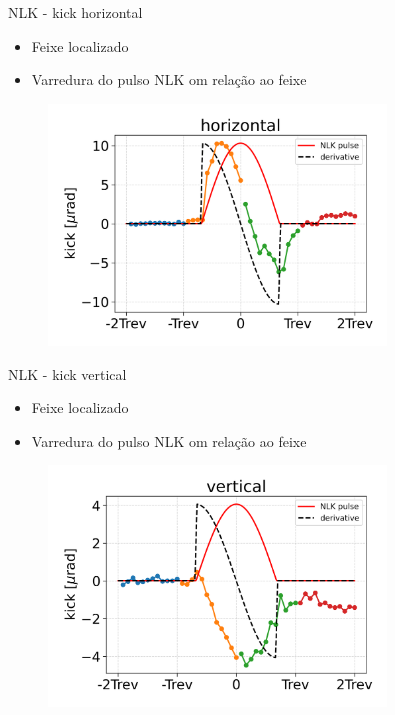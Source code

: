 \documentclass{beamer}					  %
\begin{document}
\begin{frame}{NLK - kick horizontal}
    \scriptsize{\begin{itemize}
    		\item Feixe localizado
            \item Varredura do pulso NLK om relação ao feixe
    \end{itemize}}
    \begin{figure}[H]
        	\centering
            \includegraphics[width=0.8\textwidth]{2024-01-26/figures/nlk_horizontal_kick_profile.png}
            \label{fig:nlk-h-kick-profile}
    \end{figure} 
\end{frame}

\begin{frame}{NLK - kick vertical}
    \scriptsize{\begin{itemize}
    		\item Feixe localizado
            \item Varredura do pulso NLK om relação ao feixe
    \end{itemize}}
    \begin{figure}[H]
        	\centering
            \includegraphics[width=0.8\textwidth]{2024-01-26/figures/nlk_vertical_kick_profile.png}
            \label{fig:nlk-v-kick-profile}
    \end{figure} 
\end{frame}
\end{document}
